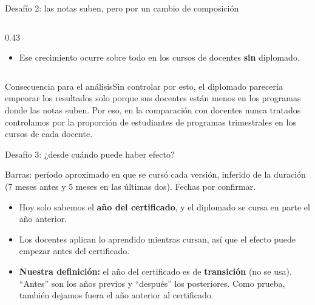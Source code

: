 \documentclass[10pt,aspectratio=169]{beamer}
\newcommand{\sintesis}[2]{%
  \begin{block}{#1}#2\end{block}}
\begin{document}
\begin{frame}{Desafío 2: las notas suben, pero por un cambio de composición}
\begin{columns}[c]
\begin{column}{0.43\textwidth}
\begin{itemize}
        \item Ese crecimiento ocurre sobre todo en los cursos de docentes \textbf{sin} diplomado.
      \end{itemize}
    \end{column}
  \end{columns}
  \vspace{-0.4em}
  \sintesis{Consecuencia para el análisis}{Sin controlar por esto, el diplomado parecería empeorar los resultados solo porque sus docentes están menos en los programas donde las notas suben. Por eso, en la comparación con docentes nunca tratados controlamos por la proporción de estudiantes de programas trimestrales en los cursos de cada docente.}
\end{frame}

\begin{frame}{Desafío 3: ¿desde cuándo puede haber efecto?}
  \begin{center}
  \end{center}
  {\scriptsize Barras: período aproximado en que se cursó cada versión, inferido de la duración (7 meses antes y 5 meses en las últimas dos). \alert{Fechas por confirmar.}}
  \vspace{0.3em}
  \begin{itemize}\small
    \item Hoy solo sabemos el \textbf{año del certificado}, y el diplomado se cursa en parte el año anterior.
    \item Los docentes aplican lo aprendido mientras cursan, así que el efecto puede empezar antes del certificado.
    \item \textbf{Nuestra definición:} el año del certificado es de \textbf{transición} (no se usa). ``Antes'' son los años previos y ``después'' los posteriores. Como prueba, también dejamos fuera el año anterior al certificado.
  \end{itemize}
\end{frame}
\end{document}
